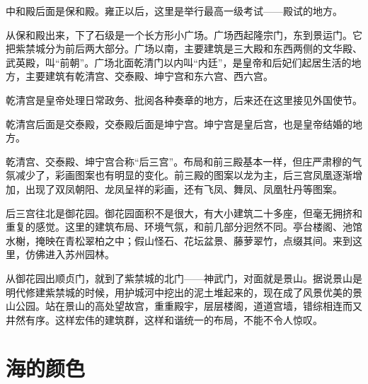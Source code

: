 \documentclass[12pt,UTF-8,openany]{ctexbook}
\begin{document}
\begin{Large}
    中和殿后面是保和殿。雍正以后，这里是举行最高一级考试——殿试的地方。
    
    从保和殿出来，下了石级是一个长方形小广场。广场西起隆宗门，东到景运门。它把紫禁城分为前后两大部分。广场以南，主要建筑是三大殿和东西两侧的文华殿、武英殿，叫“前朝”。广场北面乾清门以内叫“内廷”，是皇帝和后妃们起居生活的地方，主要建筑有乾清宫、交泰殿、坤宁宫和东六宫、西六宫。
    
    乾清宫是皇帝处理日常政务、批阅各种奏章的地方，后来还在这里接见外国使节。
    
    乾清宫后面是交泰殿，交泰殿后面是坤宁宫。坤宁宫是皇后宫，也是皇帝结婚的地方。
    
    乾清宫、交泰殿、坤宁宫合称“后三宫”。布局和前三殿基本一样，但庄严肃穆的气氛减少了，彩画图案也有明显的变化。前三殿的图案以龙为主，后三宫凤凰逐渐增加，出现了双凤朝阳、龙凤呈祥的彩画，还有飞凤、舞凤、凤凰牡丹等图案。
    
    后三宫往北是御花园。御花园面积不是很大，有大小建筑二十多座，但毫无拥挤和重复的感觉。这里的建筑布局、环境气氛，和前几部分迥然不同。亭台楼阁、池馆水榭，掩映在青松翠柏之中；假山怪石、花坛盆景、藤萝翠竹，点缀其间。来到这里，仿佛进入苏州园林。
    
    从御花园出顺贞门，就到了紫禁城的北门——神武门，对面就是景山。据说景山是明代修建紫禁城的时候，用护城河中挖出的泥土堆起来的，现在成了风景优美的景山公园。站在景山的高处望故宫，重重殿宇，层层楼阁，道道宫墙，错综相连而又井然有序。这样宏伟的建筑群，这样和谐统一的布局，不能不令人惊叹。
    
\end{Large}

\chapter{海的颜色}
\end{document}
